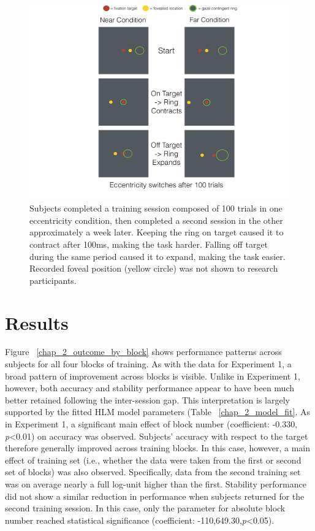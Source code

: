 \begin{figure}[!htbp]
\centering
\includegraphics[width=.75\linewidth,height=.75\textheight,keepaspectratio]{figures/chapter_2/eccentricity_demo.pdf}
\caption[Schematic Depiction of Experimental Design for Experiment 2]{Subjects completed a training session composed of 100 trials in one eccentricity condition, then completed a second session in the other approximately a week later. Keeping the ring on target caused it to contract after 100ms, making the task harder. Falling off target during the same period caused it to expand, making the task easier. Recorded foveal position (yellow circle) was not shown to research participants.}\label{chap_2_demo_figure}
\end{figure}

\section{Results}

Figure ~\ref{chap_2_outcome_by_block} shows performance patterns across subjects for all four blocks of training. As with the data for Experiment 1, a broad pattern of improvement across blocks is visible. Unlike in Experiment 1, however, both accuracy and stability performance appear to have been much better retained following the inter-session gap. This interpretation is largely supported by the fitted HLM model parameters (Table ~\ref{chap_2_model_fit}. As in Experiment 1, a significant main effect of block number (coefficient: -0.330, \textit{p}\textless0.01) on accuracy was observed. Subjects' accuracy with respect to the target therefore generally improved across training blocks. In this case, however, a main effect of training set (i.e., whether the data were taken from the first or second set of blocks) was also observed. Specifically, data from the second training set was on average nearly a full log-unit higher than the first. Stability performance did not show a similar reduction in performance when subjects returned for the second training session. In this case, only the parameter for absolute block number reached statistical significance (coefficient: -110,649.30,\textit{p}\textless0.05).

